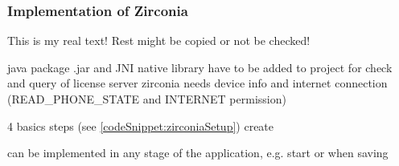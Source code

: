 \subsubsection{Implementation of Zirconia} \label{section:license-samsung-implementation}
This is my real text! Rest might be copied or not be checked!

%
java package .jar and JNI native library have to be added to project
for check and query of license server zirconia needs device info and internet connection (READ\_PHONE\_STATE and INTERNET permission)

4 basics steps (see \ref{codeSnippet:zirconiaSetup})
create

can be implemented in any stage of the application, e.g. start or when saving

\cite{samsungZirconia}
%





